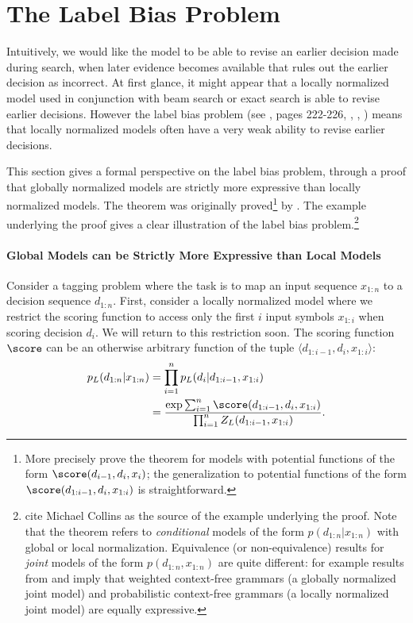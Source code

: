 \section{The Label Bias Problem}
\label{sec:label_bias}

Intuitively, we would like the model to be able to revise an earlier
decision made during search, when later evidence becomes available
that rules out the earlier decision as incorrect. At first glance, it
might appear that a locally normalized model used in conjunction with
beam search or exact search is able to revise earlier
decisions. However the label bias problem 
(see ,
pages 222-226,
,
, 
) means that locally normalized models often have a very
weak ability to revise earlier decisions.

This section gives a formal perspective on the label bias problem,
through a proof that globally normalized models are strictly more
expressive than locally normalized models. The theorem was originally
proved\footnote{More precisely  prove the
  theorem for models with potential functions of the form
  $\score(d_{i-1}, d_i, x_i)$; the generalization to potential
  functions of the form $\score(d_{1:i-1}, d_i, x_{1:i})$ is
  straightforward.}  by .
The example
underlying the proof gives a clear illustration of the label bias
problem.\footnote{ cite Michael Collins
as the source of the example underlying the proof.  
Note that the theorem refers to {\em conditional} models of the form
$p(d_{1:n} | x_{1:n})$ with global or local normalization.
Equivalence (or non-equivalence) results for {\em joint} models of the
form $p(d_{1:n}, x_{1:n})$ are quite different: for example
results from  and  imply that weighted
context-free grammars (a globally normalized joint model) and
probabilistic context-free grammars (a locally normalized joint model)
are equally expressive.}


\paragraph{Global Models can be Strictly More Expressive than
Local Models}
Consider a tagging problem where the task is to map an input sequence
$x_{1:n}$ to a decision sequence $d_{1:n}$.
First, consider a locally normalized model
where we restrict the scoring function to access only the first
$i$ input symbols $x_{1:i}$ when scoring decision $d_i$.
We will return to this restriction soon.
The scoring function $\score$ can be an otherwise arbitrary function of the
tuple $\langle d_{1:i-1}, d_i, x_{1:i} \rangle$:
\begin{align*}
p_L(d_{1:n} | x_{1:n})
&=\prod_{i=1}^n p_L(d_i | d_{1:i-1}, x_{1:i}) \\
&= \frac{\exp \sum_{i=1}^n \score(d_{1:i-1},d_i, x_{1:i}) }
{\prod_{i=1}^n Z_L(d_{1:i-1}, x_{1:i})}.
\end{align*}

